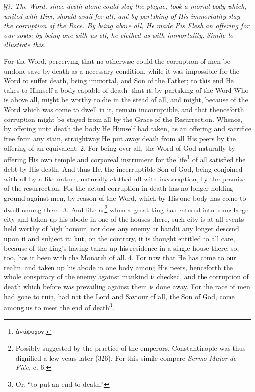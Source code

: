 
§9. \emph{The Word, since death alone could stay the plague, took a mortal body which, united with Him, should avail for all, and by partaking of His immortality stay the corruption of the Race. By being above all, He made His Flesh an offering for our souls; by being one with us all, he clothed us with immortality. Simile to illustrate this.}

For the Word, perceiving that no otherwise could the corruption of men be undone save by death as a necessary condition, while it was impossible for the Word to suffer death, being immortal, and Son of the Father; to this end He takes to Himself a body capable of death, that it, by partaking of the Word Who is above all, might be worthy to die in the stead of all, and might, because of the Word which was come to dwell in it, remain incorruptible, and that thenceforth corruption might be stayed from all by the Grace of the Resurrection. Whence, by offering unto death the body He Himself had taken, as an offering and sacrifice free from any stain, straightway He put away death from all His peers by the offering of an equivalent. 2. For being over all, the Word of God naturally by offering His own temple and corporeal instrument for the life\footnote{\textgreek{ἀντίψυχον}.} of all satisfied the debt by His death. And thus He, the incorruptible Son of God, being conjoined with all by a like nature, naturally clothed all with incorruption, by the promise of the resurrection. For the actual corruption in death has no longer holding-ground against men, by reason of the Word, which by His one body has come to dwell among them. 3. And like as\footnote{Possibly suggested by the practice of the emperors. Constantinople was thus dignified a few years later (326). For this simile compare \emph{Sermo Major de Fide,} c. 6.} when a great king has entered into some large city and taken up his abode in one of the houses there, such city is at all events held worthy of high honour, nor does any enemy or bandit any longer descend upon it and subject it; but, on the contrary, it is thought entitled to all care, because of the king’s having taken up his residence in a single house there: so, too, has it been with the Monarch of all. 4. For now that He has come to our realm, and taken up his abode in one body among His peers, henceforth the whole conspiracy of the enemy against mankind is checked, and the corruption of death which before was prevailing against them is done away. For the race of men had gone to ruin, had not the Lord and Saviour of all, the Son of God, come among us to meet the end of death\footnote{Or, “to put an end to death.”}.

